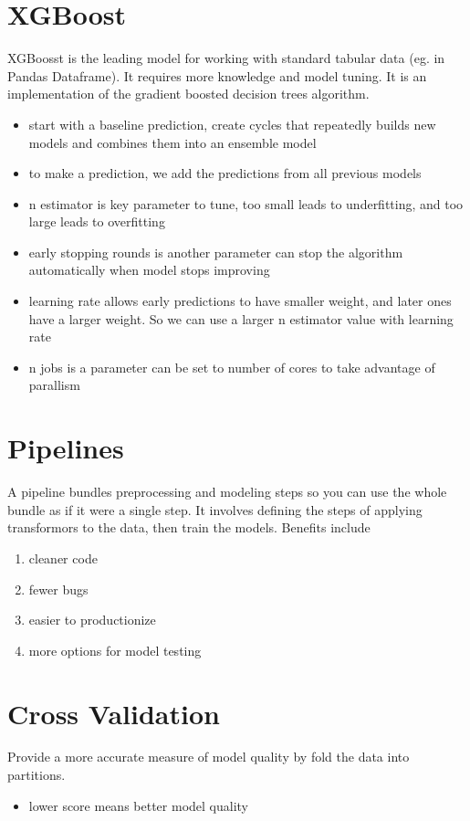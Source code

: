 \documentclass[11pt]{article}
\begin{document}
\section{XGBoost}
\label{sec:orgaf89eea}
XGBoosst is the leading model for working with standard tabular data (eg. in Pandas Dataframe). It requires more knowledge and model tuning. It is an implementation of the gradient boosted decision trees algorithm.
\begin{itemize}
\item start with a baseline prediction, create cycles that repeatedly builds new models and combines them into an ensemble model
\item to make a prediction, we add the predictions from all previous models
\item n estimator is key parameter to tune, too small leads to underfitting, and too large leads to overfitting
\item early stopping rounds is another parameter can stop the algorithm automatically when model stops improving
\item learning rate allows early predictions to have smaller weight, and later ones have a larger weight. So we can use a larger n estimator value with learning rate
\item n jobs is a parameter can be set to number of cores to take advantage of parallism
\end{itemize}

\section{Pipelines}
\label{sec:org8d7c60a}
A pipeline bundles preprocessing and modeling steps so you can use the whole bundle as if it were a single step. It involves defining the steps of applying transformors to the data, then train the models. Benefits include
\begin{enumerate}
\item cleaner code
\item fewer bugs
\item easier to productionize
\item more options for model testing
\end{enumerate}

\section{Cross Validation}
\label{sec:orgf4bcb24}
Provide a more accurate measure of model quality by fold the data into partitions.
\begin{itemize}
\item lower score means better model quality
\end{itemize}
\end{document}
